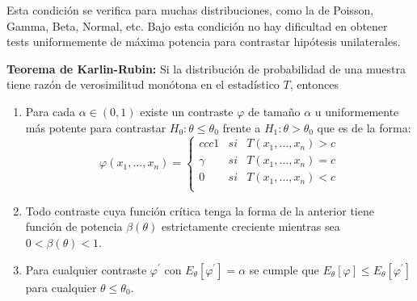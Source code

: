 Esta condici\'on se verifica para muchas distribuciones, como la de Poisson, Gamma, Beta, Normal, etc. Bajo esta condici\'on no hay dificultad en obtener tests uniformemente de m\'axima potencia para contrastar hip\'otesis unilaterales.

\begin{teorema}
\textbf{Teorema de Karlin-Rubin:} Si la distribuci\'on de probabilidad de una muestra tiene raz\'on de verosimilitud mon\'otona en el estad\'istico $T$, entonces 
\begin{enumerate}
\item Para cada $\alpha\in(0,1)$ existe un contraste $\varphi$ de tama\~no $\alpha$ u uniformemente m\'as potente para contrastar $H_0:\theta\leq\theta_0$ frente a $H_1:\theta>\theta_0$ que es de la forma:
\begin{equation*}
\varphi(x_1,\ldots,x_n)=\left\{\begin{matrix}{ccc}
1 & si & T(x_1,\ldots,x_n)>c \\
\gamma & si & T(x_1,\ldots,x_n)=c \\
0 & si & T(x_1,\ldots,x_n)<c \\
\end{matrix}\right.
\end{equation*}
\item Todo contraste cuya funci\'on cr\'itica tenga la forma de la anterior tiene funci\'on de potencia $\beta(\theta)$ estrictamente creciente mientras sea $0<\beta(\theta)<1$.
\item Para cualquier contraste $\varphi^{\prime}$ con $E_{\theta}[\varphi^{\prime}]=\alpha$ se cumple que $E_{\theta}[\varphi]\leq E_{\theta}[\varphi^{\prime}]$ para cualquier $\theta\leq\theta_0$.
\end{enumerate}
\end{teorema}
